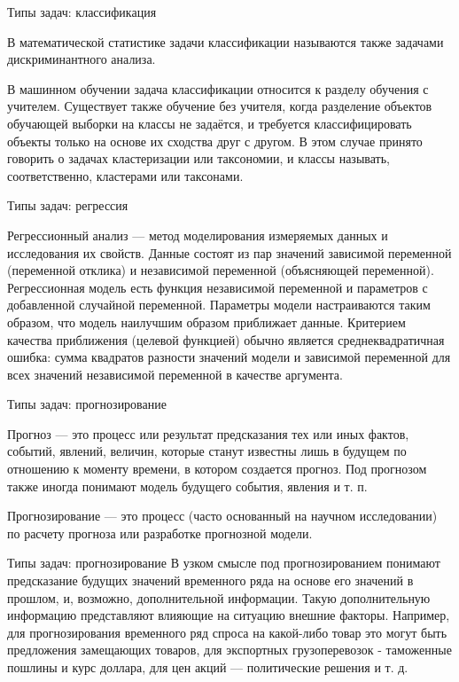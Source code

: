\documentclass{beamer}
\begin{document}
\begin{frame}{Типы задач: классификация}

В математической статистике задачи классификации называются также задачами дискриминантного анализа.

В машинном обучении задача классификации относится к разделу обучения с учителем. 
Существует также обучение без учителя, когда разделение объектов обучающей выборки на классы не задаётся, 
и требуется классифицировать объекты только на основе их сходства друг с другом. 
В этом случае принято говорить о задачах кластеризации или таксономии, и классы называть, 
соответственно, кластерами или таксонами. 



\end{frame}


\begin{frame}{Типы задач:  регрессия}

Регрессионный анализ — метод моделирования измеряемых данных и исследования их свойств. 
Данные состоят из пар значений зависимой переменной (переменной отклика) и независимой 
переменной (объясняющей переменной). 
Регрессионная модель есть функция независимой переменной и параметров с добавленной случайной переменной. 
Параметры модели настраиваются таким образом, что модель наилучшим образом приближает данные.
Критерием качества приближения (целевой функцией) обычно является среднеквадратичная ошибка: сумма квадратов разности значений модели и зависимой переменной для всех значений независимой переменной в качестве аргумента. 
 
\end{frame}




\begin{frame}{Типы задач: прогнозирование}

Прогноз — это процесс или результат предсказания тех или иных фактов, событий, 
явлений, величин, которые станут известны лишь в будущем по 
отношению к моменту времени, в котором создается прогноз. Под прогнозом также иногда понимают 
модель будущего события, явления и т. п.

Прогнозирование — это процесс (часто основанный на научном исследовании) по расчету 
прогноза или разработке прогнозной модели.


\end{frame}

\begin{frame}{Типы задач: прогнозирование}
В узком смысле под прогнозированием понимают предсказание будущих значений временного 
ряда на основе его значений в прошлом, и, возможно, дополнительной информации. 
Такую дополнительную информацию представляют влияющие на ситуацию внешние факторы. 
Например, для прогнозирования временного ряд спроса на какой-либо товар 
это могут быть предложения замещающих товаров, для экспортных грузоперевозок - 
таможенные пошлины и курс доллара, для цен акций — политические решения и т. д. 


\end{frame}
\end{document}
